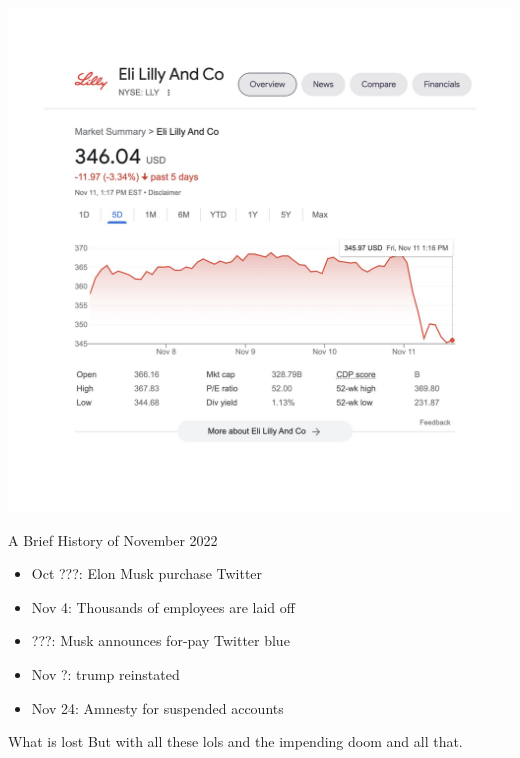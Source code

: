 \documentclass{beamer}
\begin{document}
\begin{frame}
	\includegraphics[width = \textwidth]{eli-lilly-stock}
\end{frame}

\begin{frame}{A Brief History of November 2022}
	\begin{itemize}
	\item Oct ???: Elon Musk purchase Twitter
	\item Nov 4: Thousands of employees are laid off
	\item ???: Musk announces for-pay Twitter blue
	\pause
	\item Nov ?: trump reinstated
	\pause
	\item Nov 24: Amnesty for suspended accounts	
	
	\end{itemize}
\end{frame}
\begin{frame}{What is lost}
	But with all these lols and the impending doom and all that.
\end{frame}
\end{document}
